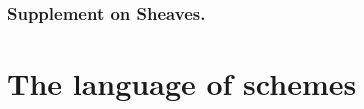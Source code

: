 \documentclass[10pt,oneside]{amsart}
\begin{document}
    \section{Supplement on Sheaves.}

        \subsection{ }
        

        \subsection{ }
        

        \subsection{ }
        

        \subsection{ }
        

        \subsection{ }
        

        \subsection{ }
        

        \subsection{ }
        

        \subsection{ }
        



\clearpage


\setcounter{subsection}{0}
\part{The language of schemes}
    
\end{document}
